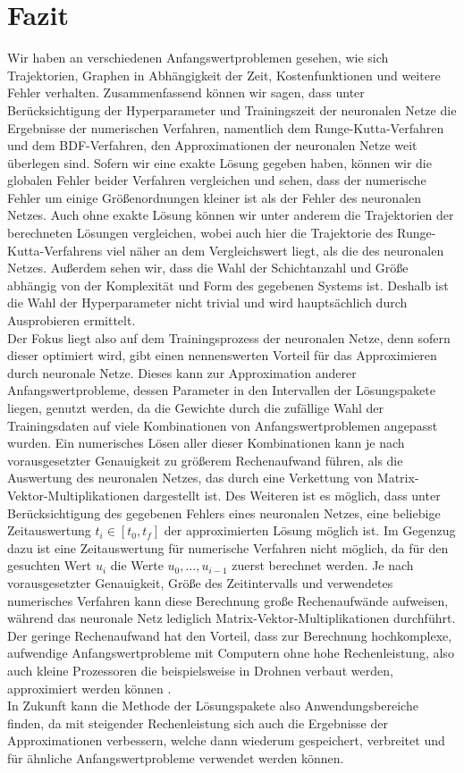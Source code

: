 \section{Fazit}
\label{sec:resultat}
Wir haben an verschiedenen Anfangswertproblemen gesehen, wie sich Trajektorien, Graphen in Abhängigkeit der Zeit,
Kostenfunktionen und weitere Fehler verhalten. Zusammenfassend können wir sagen, dass unter Berücksichtigung der
Hyperparameter und Trainingszeit der neuronalen Netze die Ergebnisse der numerischen Verfahren, namentlich dem
Runge-Kutta-Verfahren und dem BDF-Verfahren, den Approximationen der neuronalen Netze weit überlegen sind. Sofern wir
eine exakte Lösung gegeben haben, können wir die globalen Fehler beider Verfahren vergleichen und sehen, dass der
numerische Fehler um einige Größenordnungen kleiner ist als der Fehler des neuronalen Netzes.
Auch ohne exakte Lösung können wir unter anderem die Trajektorien der berechneten Lösungen vergleichen, wobei auch hier
die Trajektorie des Runge-Kutta-Verfahrens viel näher an dem Vergleichswert liegt, als die des neuronalen Netzes.
Außerdem sehen wir, dass die Wahl der Schichtanzahl und Größe abhängig von der Komplexität und Form des gegebenen
Systems ist. Deshalb ist die Wahl der Hyperparameter nicht trivial und wird hauptsächlich durch Ausprobieren ermittelt.\\
Der Fokus liegt also auf dem Trainingsprozess der neuronalen Netze, denn sofern dieser optimiert wird, gibt einen
nennenswerten Vorteil für das Approximieren durch neuronale Netze. Dieses kann zur Approximation anderer
Anfangswertprobleme, dessen Parameter in den Intervallen der Lösungspakete liegen, genutzt werden, da die Gewichte
durch die zufällige Wahl der Trainingsdaten auf viele Kombinationen von Anfangswertproblemen angepasst wurden. Ein
numerisches Lösen aller dieser Kombinationen kann je nach vorausgesetzter Genauigkeit zu größerem Rechenaufwand führen,
als die Auswertung des neuronalen Netzes, das durch eine Verkettung von Matrix-Vektor-Multiplikationen dargestellt ist.
Des Weiteren ist es möglich, dass unter Berücksichtigung des gegebenen Fehlers eines neuronalen Netzes, eine beliebige
Zeitauswertung $t_i \in [t_0, t_f]$ der approximierten Lösung möglich ist. Im Gegenzug dazu ist eine Zeitauswertung für
numerische Verfahren nicht möglich, da für den gesuchten Wert $u_i$ die Werte $ u_0, \dots, u_{i-1}$ zuerst berechnet
werden. Je nach vorausgesetzter Genauigkeit, Größe des Zeitintervalls und verwendetes numerisches Verfahren kann diese
Berechnung große Rechenaufwände aufweisen, während das neuronale Netz lediglich Matrix-Vektor-Multiplikationen
durchführt. Der geringe Rechenaufwand hat den Vorteil, dass zur Berechnung hochkomplexe, aufwendige Anfangswertprobleme
mit Computern ohne hohe Rechenleistung, also auch kleine Prozessoren die beispielsweise in Drohnen verbaut werden,
approximiert werden können \cite[9]{flamantSolvingDifferentialEquations2020}.\\
In Zukunft kann die Methode der Lösungspakete also Anwendungsbereiche finden, da mit steigender Rechenleistung sich auch
die Ergebnisse der Approximationen verbessern, welche dann wiederum gespeichert, verbreitet und für ähnliche
Anfangswertprobleme verwendet werden können.
